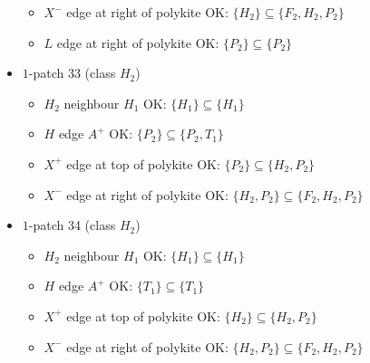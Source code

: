 \begin{itemize}
\begin{itemize}
\item $X^-$ edge at right of polykite OK: $\{H_2\} \subseteq \{F_2, H_2, P_2\}$
\item $L$ edge at right of polykite OK: $\{P_2\} \subseteq \{P_2\}$
\end{itemize}
\item $1$-patch 33 (class $H_2$)
\begin{itemize}
\item $H_2$ neighbour $H_1$ OK: $\{H_1\} \subseteq \{H_1\}$
\item $H$ edge $A^+$ OK: $\{P_2\} \subseteq \{P_2, T_1\}$
\item $X^+$ edge at top of polykite OK: $\{P_2\} \subseteq \{H_2, P_2\}$
\item $X^-$ edge at right of polykite OK: $\{H_2, P_2\} \subseteq \{F_2, H_2, P_2\}$
\end{itemize}
\item $1$-patch 34 (class $H_2$)
\begin{itemize}
\item $H_2$ neighbour $H_1$ OK: $\{H_1\} \subseteq \{H_1\}$
\item $H$ edge $A^+$ OK: $\{T_1\} \subseteq \{T_1\}$
\item $X^+$ edge at top of polykite OK: $\{H_2\} \subseteq \{H_2, P_2\}$
\item $X^-$ edge at right of polykite OK: $\{H_2, P_2\} \subseteq \{F_2, H_2, P_2\}$
\end{itemize}
\end{itemize}
